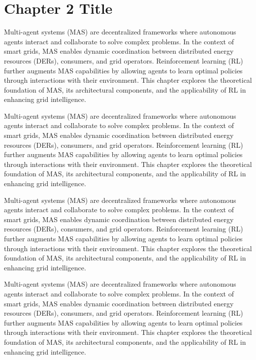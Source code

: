 \chapter{Chapter 2 Title}


Multi-agent systems (MAS) are decentralized frameworks where autonomous agents interact and collaborate to solve complex problems. 
In the context of smart grids, MAS enables dynamic coordination between distributed energy resources (DERs), consumers, and grid operators. 
Reinforcement learning (RL) further augments MAS capabilities by allowing agents to learn optimal policies through interactions with their environment. 
This chapter explores the theoretical foundation of MAS, its architectural components, and the applicability of RL in enhancing grid intelligence.

Multi-agent systems (MAS) are decentralized frameworks where autonomous agents interact and collaborate to solve complex problems. 
In the context of smart grids, MAS enables dynamic coordination between distributed energy resources (DERs), consumers, and grid operators. 
Reinforcement learning (RL) further augments MAS capabilities by allowing agents to learn optimal policies through interactions with their environment. 
This chapter explores the theoretical foundation of MAS, its architectural components, and the applicability of RL in enhancing grid intelligence.

Multi-agent systems (MAS) are decentralized frameworks where autonomous agents interact and collaborate to solve complex problems. 
In the context of smart grids, MAS enables dynamic coordination between distributed energy resources (DERs), consumers, and grid operators. 
Reinforcement learning (RL) further augments MAS capabilities by allowing agents to learn optimal policies through interactions with their environment. 
This chapter explores the theoretical foundation of MAS, its architectural components, and the applicability of RL in enhancing grid intelligence.

Multi-agent systems (MAS) are decentralized frameworks where autonomous agents interact and collaborate to solve complex problems. 
In the context of smart grids, MAS enables dynamic coordination between distributed energy resources (DERs), consumers, and grid operators. 
Reinforcement learning (RL) further augments MAS capabilities by allowing agents to learn optimal policies through interactions with their environment. 
This chapter explores the theoretical foundation of MAS, its architectural components, and the applicability of RL in enhancing grid intelligence.

